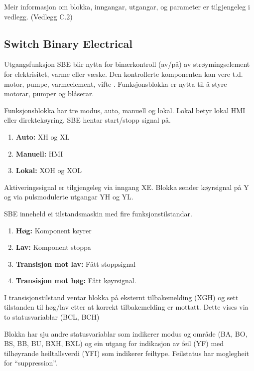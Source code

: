 Meir informasjon om blokka, inngangar, utgangar, og parameter er tilgjengeleg i vedlegg. (Vedlegg C.2)

\newpage

\subsection{Switch Binary Electrical} 

Utgangsfunksjon \gls{SBE} blir nytta for binærkontroll (av/på) av strøymingselement for elektrisitet, varme eller væske. 
Den kontrollerte komponenten kan vere t.d. motor, pumpe, varmeelement, vifte \citep{IEC-63131}. \newline
Funksjonsblokka er nytta til å styre motorar, pumper og blåserar.

Funksjonsblokka har tre modus, auto, manuell og lokal. Lokal betyr lokal HMI eller direktekøyring. \newline
\gls{SBE} hentar start/stopp signal på.
\begin{enumerate}
    \item \textbf{Auto:}        XH og XL  
    \item \textbf{Manuell:}     HMI
    \item \textbf{Lokal:}       XOH og XOL
\end{enumerate}
Aktiveringssignal er tilgjengeleg via inngang XE. \newline
Blokka sender køyrsignal på Y og via pulsmodulerte utgangar YH og YL.

\gls{SBE} inneheld ei tilstandsmaskin med fire funksjonstilstandar. 
\begin{enumerate}
    \item \textbf{Høg:}                 Komponent køyrer
    \item \textbf{Lav:}                 Komponent stoppa
    \item \textbf{Transisjon mot lav:}  Fått stoppsignal
    \item \textbf{Transisjon mot høg:}  Fått køyrsignal.
\end{enumerate}

I transisjonstilstand ventar blokka på eksternt tilbakemelding (XGH) 
og sett tilstanden til høg/lav etter at korrekt tilbakemelding er mottatt.
Dette vises via to statusvariablar (BCL, BCH)

Blokka har sju andre statusvariablar som indikerer modus og område (BA, BO, BS, BB, BU, BXH, BXL) og
ein utgang for indikasjon av feil (YF) med tilhøyrande heiltallsverdi (YFI) som indikerer feiltype. \newline
Feilstatus har moglegheit for ``suppression''.

